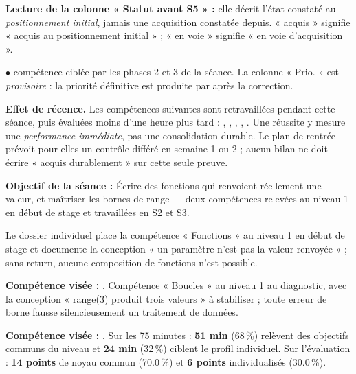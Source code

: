\documentclass[10pt,a4paper]{article}
\begin{document}
\par\vspace{1mm}\small\textbf{Lecture de la colonne « Statut avant S5 » :} elle décrit l'état constaté au \emph{positionnement initial}, jamais une acquisition constatée depuis. « acquis » signifie « acquis au positionnement initial » ; « en voie » signifie « en voie d'acquisition ».
\par\small$\bullet$ compétence ciblée par les phases 2 et 3 de la séance. La colonne « Prio. » est \emph{provisoire} : la priorité définitive est produite par  après la correction.
\begin{warningbox}\textbf{Effet de récence.} Les compétences suivantes sont retravaillées pendant cette séance, puis évaluées moins d'une heure plus tard : , , , , . Une réussite y mesure une \emph{performance immédiate}, pas une consolidation durable. Le plan de rentrée prévoit pour elles un contrôle différé en semaine 1 ou 2 ; aucun bilan ne doit écrire « acquis durablement » sur cette seule preuve.\end{warningbox}
\begin{goalbox}\textbf{Objectif de la séance :} Écrire des fonctions qui renvoient réellement une valeur, et maîtriser les bornes de range — deux compétences relevées au niveau 1 en début de stage et travaillées en S2 et S3.\end{goalbox}
Le dossier individuel place la compétence « Fonctions » au niveau 1 en début de stage et documente la conception « un paramètre n'est pas la valeur renvoyée » ; sans return, aucune composition de fonctions n'est possible.
\par\vspace{1mm}\textbf{Compétence visée :} .
Compétence « Boucles » au niveau 1 au diagnostic, avec la conception « range(3) produit trois valeurs » à stabiliser ; toute erreur de borne fausse silencieusement un traitement de données.
\par\vspace{1mm}\textbf{Compétence visée :} .
Sur les 75 minutes : \textbf{51 min} (68\,\%) relèvent des objectifs communs du niveau et \textbf{24 min} (32\,\%) ciblent le profil individuel. Sur l'évaluation : \textbf{14 points} de noyau commun (70.0\,\%) et \textbf{6 points} individualisés (30.0\,\%).
\end{document}
